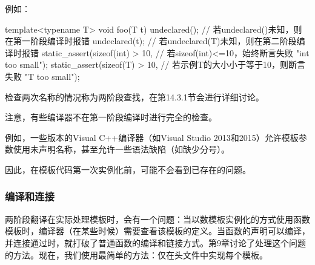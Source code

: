 例如：

\begin{cpp}
template<typename T>
void foo(T t) {
	undeclared(); // 若undeclared()未知，则在第一阶段编译时报错
	undeclared(t); // 若undeclared(T)未知，则在第二阶段编译时报错
	static_assert(sizeof(int) > 10, // 若sizeof(int)<=10，始终断言失败
				  "int too small");
	static_assert(sizeof(T) > 10, // 若示例T的大小小于等于10，则断言失败
	              "T too small");
}
\end{cpp}

检查两次名称的情况称为两阶段查找，在第14.3.1节会进行详细讨论。

注意，有些编译器不在第一阶段编译时进行完全的检查。

\begin{notice}
例如，一些版本的Visual C++编译器（如Visual Studio 2013和2015）允许模板参数使用未声明名称，甚至允许一些语法缺陷（如缺少分号）。
\end{notice}

因此，在模板代码第一次实例化前，可能不会看到已存在的问题。

\subsubsection{编译和连接}

两阶段翻译在实际处理模板时，会有一个问题：当以数模板实例化的方式使用函数模板时，编译器（在某些时候）需要查看该模板的定义。当函数的声明可以编译，并连接通过时，就打破了普通函数的编译和链接方式。第9章讨论了处理这个问题的方法。现在，我们使用最简单的方法：仅在头文件中实现每个模板。








